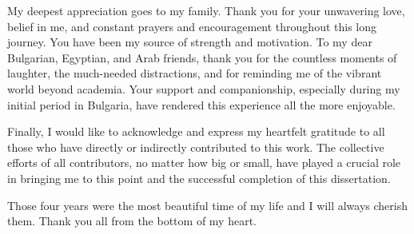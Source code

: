 My deepest appreciation goes to my family. Thank you for your unwavering love, belief in me, and constant prayers and encouragement throughout this long journey. You have been my source of strength and motivation.
To my dear Bulgarian, Egyptian, and Arab friends, thank you for the countless moments of laughter, the much-needed distractions, and for reminding me of the vibrant world beyond academia. Your support and companionship, especially during my initial period in Bulgaria, have rendered this experience all the more enjoyable.

Finally, I would like to acknowledge and express my heartfelt gratitude to all those who have directly or indirectly contributed to this work. The collective efforts of all contributors, no matter how big or small, have played a crucial role in bringing me to this point and the successful completion of this dissertation.

Those four years were the most beautiful time of my life and I will always cherish them. Thank you all from the bottom of my heart.